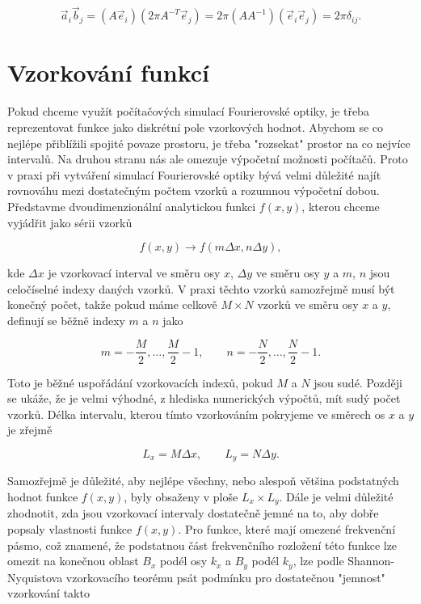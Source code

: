 \begin{equation}
\vec{a}_i \vec{b}_j = \left( A \vec{e}_i \right) \left(2 \pi A^{-T} \vec{e}_j \right)= 2 \pi \left(A A^{-1}\right) \left(\vec{e}_i \vec{e}_j\right) = 2 \pi \delta_{ij}.
\end{equation}


\section{Vzorkování funkcí}
\label{sec:vzorkovani}


Pokud chceme využít počítačových simulací Fourierovské optiky, je třeba reprezentovat funkce jako diskrétní pole vzorkových hodnot. Abychom se co nejlépe přiblížili spojité povaze prostoru, je třeba "rozsekat" prostor na co nejvíce intervalů. Na druhou stranu nás ale omezuje výpočetní možnosti počítačů. Proto v praxi při vytváření simulací Fourierovské optiky bývá velmi důležité najít rovnováhu mezi dostatečným počtem vzorků a rozumnou výpočetní dobou. \\
Představme dvoudimenzionální analytickou funkci $f(x,y)$, kterou chceme vyjádřit jako sérii vzorků

\begin{equation}
f(x,y) \rightarrow f(m \Delta x,n \Delta y),
\end{equation}

kde $\Delta x$ je vzorkovací interval ve směru osy $x$, $\Delta y$ ve směru osy $y$ a $m$, $n$ jsou celočíselné indexy daných vzorků. V praxi těchto vzorků samozřejmě musí být konečný počet, takže pokud máme celkově $M \times N$ vzorků ve směru osy $x$ a $y$, definují se běžně indexy $m$ a $n$ jako

\begin{equation}
m = -\frac{M}{2}, \dots ,\frac{M}{2}-1, \qquad n = -\frac{N}{2}, \dots ,\frac{N}{2}-1.
\end{equation}

Toto je běžné uspořádání vzorkovacích indexů, pokud $M$ a $N$ jsou sudé. Později se ukáže, že je velmi výhodné, z hlediska numerických výpočtů, mít sudý počet vzorků. Délka intervalu, kterou tímto vzorkováním pokryjeme ve směrech os $x$ a $y$ je zřejmě 

\begin{equation}
L_x = M \Delta x, \qquad L_y = N \Delta y.
\end{equation}

Samozřejmě je důležité, aby nejlépe všechny, nebo alespoň většina podstatných hodnot funkce $f(x,y)$, byly obsaženy v ploše $L_x \times L_y$. Dále je velmi důležité zhodnotit, zda jsou vzorkovací intervaly dostatečně jemné na to, aby dobře popsaly vlastnosti funkce $f(x,y)$. Pro funkce, které mají omezené frekvenční pásmo, což znamené, že podstatnou část frekvenčního rozložení této funkce lze omezit na konečnou oblast $B_x$ podél osy $k_x$ a $B_y$ podél $k_y$, lze podle Shannon-Nyquistova vzorkovacího teorému psát podmínku pro dostatečnou "jemnost" vzorkování takto

